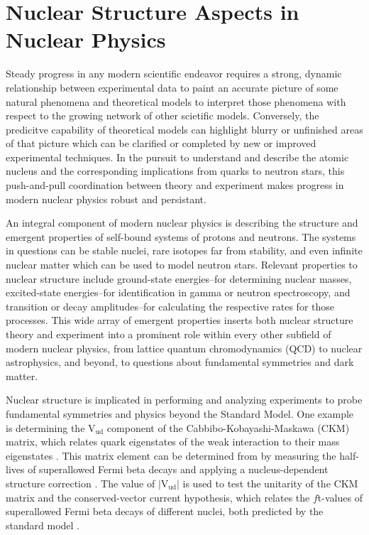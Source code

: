 \documentclass[../thesis.tex]{subfiles}
\begin{document}
\section{Nuclear Structure Aspects in Nuclear Physics}

Steady progress in any modern scientific endeavor requires a strong, dynamic relationship between experimental data to paint an accurate picture of some natural phenomena and theoretical models to interpret those phenomena with respect to the growing network of other scietific models. Conversely, the predicitve capability of theoretical models can highlight blurry or unfinished areas of that picture which can be clarified or completed by new or improved experimental techniques. In the pursuit to understand and describe the atomic nucleus and the corresponding implications from quarks to neutron stars, this push-and-pull coordination between theory and experiment makes progress in modern nuclear physics robust and persistant.

An integral component of modern nuclear physics is describing the structure and emergent properties of self-bound systems of protons and neutrons. The systems in questions can be stable nuclei, rare isotopes far from stability, and even infinite nuclear matter which can be used to model neutron stars. Relevant properties to nuclear structure include ground-state energies--for determining nuclear masses, excited-state energies--for identification in gamma or neutron spectroscopy, and transition or decay amplitudes--for calculating the respective rates for those processes. This wide array of emergent properties inserts both nuclear structure theory and experiment into a prominent role within every other subfield of modern nuclear physics, from lattice quantum chromodynamics (QCD) to nuclear astrophysics, and beyond, to questions about fundamental symmetries and dark matter.

Nuclear structure is implicated in performing and analyzing experiments to probe fundamental symmetries and physics beyond the Standard Model. One example is determining the $\mathrm{V_{ud}}$ component of the Cabbibo-Kobayashi-Maskawa (CKM) matrix, which relates quark eigenstates of the weak interaction to their mass eigenstates \cite{CABBIBO1963531,KOBAYASHI1973652}. This matrix element can be determined from by measuring the half-lives of superallowed Fermi beta decays \cite{TOWNER2003197} and applying a nucleus-dependent structure correction \cite{TOWNER2008025501,TOWNER199413,TOWNER1992478,BARKER1992501,JAUS1990166}. The value of $\left|\mathrm{V_{ud}}\right|$ is used to test the unitarity of the CKM matrix and the conserved-vector current hypothesis, which relates the $f$t-values of superallowed Fermi beta decays of different nuclei, both predicted by the standard model \cite{HARDY2005055501}.
\end{document}
